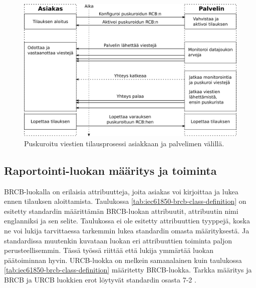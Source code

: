 \begin{figure}
	\includegraphics[width=1\textwidth]{pictures/iec61850-brcb-communication.png}
	\caption{Puskuroitu viestien tilausprosessi asiakkaan ja palvelimen välillä.}
	\label{fig:iec61850-brcb-communication}
\end{figure}


\subsection{Raportointi-luokan määritys ja toiminta}
BRCB-luokalla on erilaisia attribuutteja, joita asiakas voi kirjoittaa ja lukea ennen tilauksen aloittamista. Taulukossa \ref{tab:iec61850-brcb-class-definition} on esitetty standardin määrittämän BRCB-luokan attribuutit, attribuutin nimi englanniksi ja sen selite. Taulukossa ei ole esitetty attribuuttien tyyppejä, koska ne voi lukija tarvittaessa tarkemmin lukea standardin omasta määrityksestä. Ja standardissa muutenkin kuvataan luokan eri attribuuttien toiminta paljon perusteellisemmin. Tässä työssä riittää että lukija ymmärtää luokan päätoiminnan hyvin. URCB-luokka on melkein samanalainen kuin taulukossa \ref{tab:iec61850-brcb-class-definition} määritetty BRCB-luokka. Tarkka määritys ja BRCB ja URCB luokkien erot löytyvät standardin osasta 7-2 \cite[s.~93--118]{IEC61850-7-2}.

